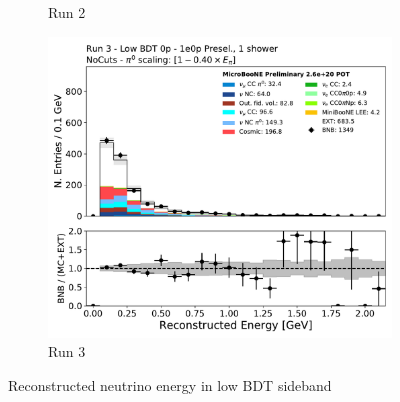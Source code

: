 \begin{figure}[H]
\begin{subfigure}{0.3\textwidth}
    \caption{Run 2}
    \end{subfigure}
    \begin{subfigure}{0.3\textwidth}
    \includegraphics[width=1.0\textwidth]{1e0p/Low_BDT_Sideband/run3/reco_e.pdf}
    \caption{Run 3}
    \end{subfigure}
    \caption{Reconstructed neutrino energy in low BDT sideband} 
    \label{fig:low_0pbdt_timedep}
\end{figure}

